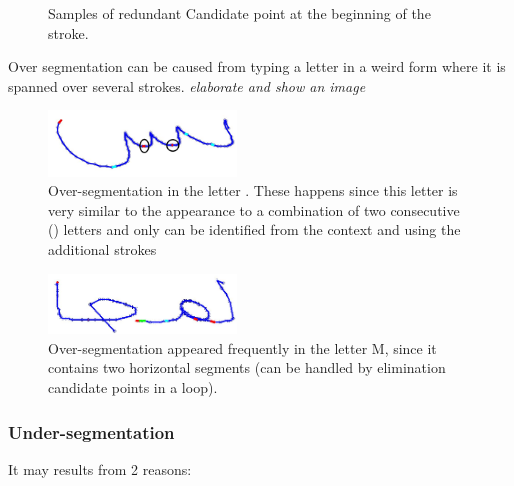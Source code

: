 \documentclass[journal,compsoc]{IEEEtran}
\begin{document}
\begin{figure}
\centering
    \caption{Samples of redundant Candidate point at the beginning of the  stroke.}
   \label{fig:oversegmentation_begin}
\end{figure}

Over segmentation can be caused from typing a letter in a weird form where it is spanned over several strokes. \emph{elaborate and show an image}

\begin{figure}
\centering
\includegraphics[width=5cm]{./figures/oversegmentation_s}
\caption{Over-segmentation in the letter . These happens since this letter is very similar to the appearance to a combination of two consecutive  () letters and only can be identified from the context and using the additional strokes }
\label{fig:oversegmentation_s}
\end{figure}

\begin{figure}
\centering
\includegraphics[width=5cm]{./figures/oversegmentation_m}
\caption{Over-segmentation appeared frequently in the letter M, since it contains two horizontal segments (can be handled by elimination candidate points in a loop).}
\label{fig:oversegmentation_m}
\end{figure}

\subsubsection{Under-segmentation}
It may results from 2 reasons:
\end{document}
